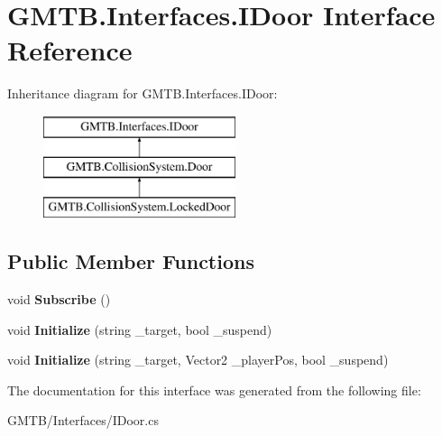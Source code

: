 \hypertarget{interface_g_m_t_b_1_1_interfaces_1_1_i_door}{}\section{G\+M\+T\+B.\+Interfaces.\+I\+Door Interface Reference}
\label{interface_g_m_t_b_1_1_interfaces_1_1_i_door}
Inheritance diagram for G\+M\+T\+B.\+Interfaces.\+I\+Door\+:\begin{figure}[H]
\begin{center}
\leavevmode
\includegraphics[height=3.000000cm]{interface_g_m_t_b_1_1_interfaces_1_1_i_door}
\end{center}
\end{figure}
\subsection*{Public Member Functions}
\begin{DoxyCompactItemize}
\item 
\mbox{\label{interface_g_m_t_b_1_1_interfaces_1_1_i_door_a9df471a57fd2ae1ddead5e7fa99b071a}} 
void {\bfseries Subscribe} ()
\item 
\mbox{\label{interface_g_m_t_b_1_1_interfaces_1_1_i_door_acd08b3df67a5b05458d3cb12acf18780}} 
void {\bfseries Initialize} (string \+\_\+target, bool \+\_\+suspend)
\item 
\mbox{\label{interface_g_m_t_b_1_1_interfaces_1_1_i_door_a532b7acecc6ab470c92347d8c4ae68d4}} 
void {\bfseries Initialize} (string \+\_\+target, Vector2 \+\_\+player\+Pos, bool \+\_\+suspend)
\end{DoxyCompactItemize}


The documentation for this interface was generated from the following file\+:\begin{DoxyCompactItemize}
\item 
G\+M\+T\+B/\+Interfaces/I\+Door.\+cs\end{DoxyCompactItemize}
